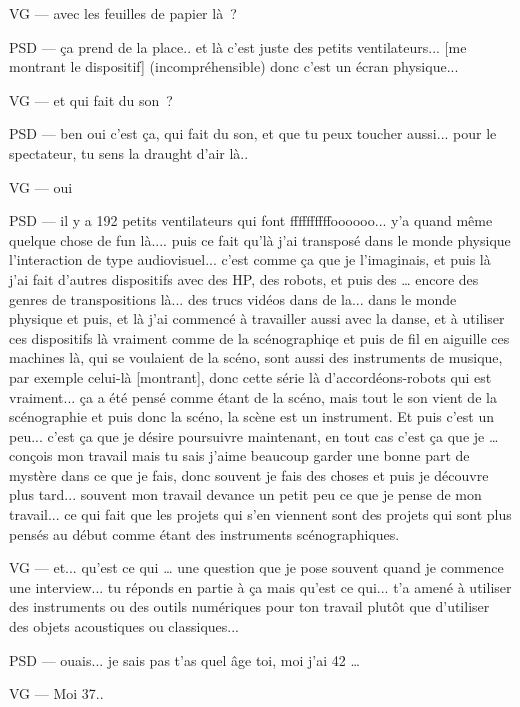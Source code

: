VG — avec les feuilles de papier là ? 

PSD — ça prend de la place.. et là c'est juste des petits ventilateurs... [me montrant le dispositif] (incompréhensible) donc c'est un écran physique... 

VG — et qui fait du son ? 

PSD — ben oui c'est ça, qui fait du son, et que tu peux toucher aussi... pour le spectateur, tu sens la draught d'air là..   

VG — oui 

PSD — il y a 192 petits ventilateurs qui font ffffffffffoooooo... y'a quand même quelque chose de fun là.... puis ce fait qu'là j'ai transposé dans le monde physique l'interaction de type audiovisuel... c'est comme ça que je l'imaginais, et puis là j'ai fait d'autres dispositifs avec des HP, des robots, et puis des … encore des genres de transpositions là... des trucs vidéos dans de la... dans le monde physique et puis, et là j'ai commencé à travailler aussi avec la danse, et à utiliser ces dispositifs là vraiment comme de la scénographiqe et puis de fil en aiguille ces machines là, qui se voulaient de la scéno, sont aussi des instruments de musique, par exemple celui-là [montrant], donc cette série là d'accordéons-robots qui est vraiment... ça a été pensé comme étant de la scéno, mais tout le son vient de la scénographie et puis donc la scéno, la scène est un instrument. Et puis c'est un peu... c'est ça que je désire poursuivre maintenant, en tout cas c'est ça que je … conçois mon travail mais tu sais j'aime beaucoup garder une bonne part de mystère dans ce que je fais, donc souvent je fais des choses et puis je découvre plus tard... souvent mon travail devance un petit peu ce que je pense de mon travail... ce qui fait que les projets qui s'en viennent sont des projets qui sont plus pensés au début comme étant des instruments scénographiques. 

VG — et... qu'est ce qui … une question que je pose souvent quand je commence une interview... tu réponds en partie à ça mais qu'est ce qui... t'a amené à utiliser des instruments ou des outils numériques pour ton travail plutôt que d'utiliser des objets acoustiques ou classiques... 

PSD — ouais... je sais pas t'as quel âge toi, moi j'ai 42 … 

VG — Moi 37.. 

